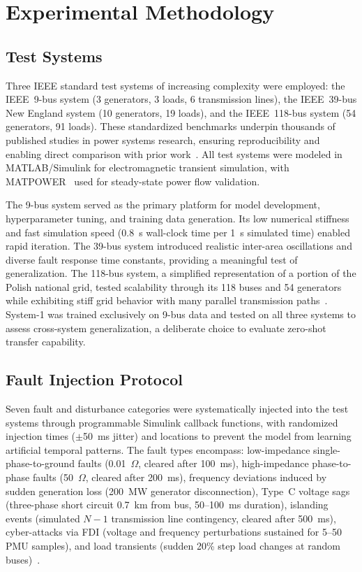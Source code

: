 \documentclass[journal]{IEEEtran}
\begin{document}
\section{Experimental Methodology}
\label{sec:methodology}

\subsection{Test Systems}

Three IEEE standard test systems of increasing complexity were employed: the IEEE~9-bus system (3 generators, 3 loads, 6 transmission lines), the IEEE~39-bus New England system (10 generators, 19 loads), and the IEEE~118-bus system (54 generators, 91 loads). These standardized benchmarks underpin thousands of published studies in power systems research, ensuring reproducibility and enabling direct comparison with prior work~\cite{ref31}. All test systems were modeled in MATLAB/Simulink for electromagnetic transient simulation, with MATPOWER~\cite{ref32} used for steady-state power flow validation.

The 9-bus system served as the primary platform for model development, hyperparameter tuning, and training data generation. Its low numerical stiffness and fast simulation speed (0.8~s wall-clock time per 1~s simulated time) enabled rapid iteration. The 39-bus system introduced realistic inter-area oscillations and diverse fault response time constants, providing a meaningful test of generalization. The 118-bus system, a simplified representation of a portion of the Polish national grid, tested scalability through its 118 buses and 54 generators while exhibiting stiff grid behavior with many parallel transmission paths~\cite{ref33}. System-1 was trained exclusively on 9-bus data and tested on all three systems to assess cross-system generalization, a deliberate choice to evaluate zero-shot transfer capability.

\subsection{Fault Injection Protocol}

Seven fault and disturbance categories were systematically injected into the test systems through programmable Simulink callback functions, with randomized injection times ($\pm$50~ms jitter) and locations to prevent the model from learning artificial temporal patterns. The fault types encompass: low-impedance single-phase-to-ground faults (0.01~$\Omega$, cleared after 100~ms), high-impedance phase-to-phase faults (50~$\Omega$, cleared after 200~ms), frequency deviations induced by sudden generation loss (200~MW generator disconnection), Type~C voltage sags (three-phase short circuit 0.7~km from bus, 50--100~ms duration), islanding events (simulated $N-1$ transmission line contingency, cleared after 500~ms), cyber-attacks via FDI (voltage and frequency perturbations sustained for 5--50 PMU samples), and load transients (sudden 20\% step load changes at random buses)~\cite{ref34}.
\end{document}
